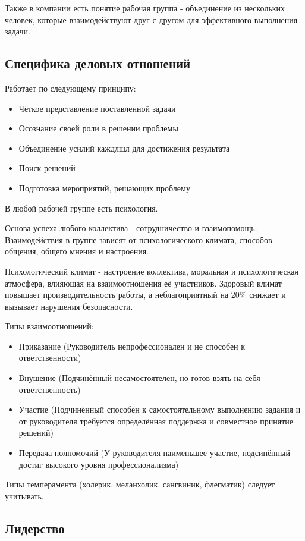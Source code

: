 Также в компании есть понятие рабочая группа - объединение из нескольких человек, которые взаимодействуют друг с другом для эффективного выполнения задачи.

\subsection{Специфика деловых отношений}

Работает по следующему принципу:
\begin{itemize}
    \item Чёткое представление поставленной задачи
    \item Осознание своей роли в решении проблемы
    \item Объединение усилий каждлшл для достижения результата
    \item Поиск решений
    \item Подготовка мероприятий, решающих проблему
\end{itemize}

В любой рабочей группе есть психология.

Основа успеха любого коллектива - сотрудничество и взаимопомощь.
Взаимодействия в группе зависят от психологического климата, способов общения, общего мнения и настроения.

Психологический климат - настроение коллектива, моральная и психологическая атмосфера, влияющая на взаимоотношения её участников. Здоровый климат повышает производительность работы, а неблагоприятный на 20\% снижает и вызывает нарушения безопасности.

Типы взаимоотношений:
\begin{itemize}
    \item Приказание (Руководитель непрофессионален и не способен к ответственности)
    \item Внушение (Подчинённый несамостоятелен, но готов взять на себя ответственность)
    \item Участие (Подчинённый способен к самостоятельному выполнению задания и от руководителя требуется определённая поддержка и совместное принятие решений)
    \item Передача полномочий (У руководителя наименьшее участие, подсинённый достиг высокого уровня профессионализма)
\end{itemize}

Типы темперамента (холерик, меланхолик, сангвиник, флегматик) следует учитывать.

\subsection{Лидерство}

